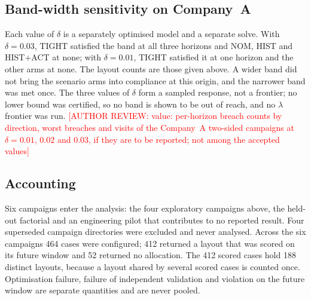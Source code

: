 \documentclass[11pt]{article}
\newcommand{\authorreview}[1]{\textcolor{red}{[AUTHOR REVIEW: #1]}}
\begin{document}
\subsection{Band-width sensitivity on Company~A}
Each value of $\delta$ is a separately optimised model and a separate solve. With $\delta=0.03$, TIGHT satisfied the band at all three horizons and NOM, HIST and HIST+ACT at none; with $\delta=0.01$, TIGHT satisfied it at one horizon and the other arms at none. The layout counts are those given above. A wider band did not bring the scenario arms into compliance at this origin, and the narrower band was met once. The three values of $\delta$ form a sampled response, not a frontier; no lower bound was certified, so no band is shown to be out of reach, and no $\lambda$ frontier was run. \authorreview{value: per-horizon breach counts by direction, worst breaches and visits of the Company~A two-sided campaigns at $\delta=0.01$, $0.02$ and $0.03$, if they are to be reported; not among the accepted values}

\subsection{Accounting}
Six campaigns enter the analysis: the four exploratory campaigns above, the held-out factorial and an engineering pilot that contributes to no reported result. Four superseded campaign directories were excluded and never analysed. Across the six campaigns 464 cases were configured; 412 returned a layout that was scored on its future window and 52 returned no allocation. The 412 scored cases hold 188 distinct layouts, because a layout shared by several scored cases is counted once. Optimisation failure, failure of independent validation and violation on the future window are separate quantities and are never pooled.

\end{document}

